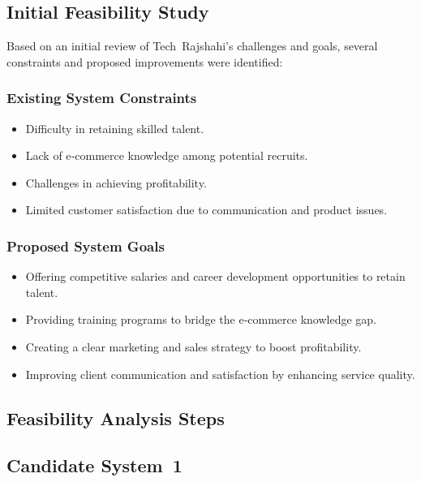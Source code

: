 \documentclass[12pt,a4paper]{article}
\begin{document}
\subsection{Initial Feasibility Study}
Based on an initial review of Tech Rajshahi’s challenges and goals, several constraints and proposed improvements were identified:
\subsubsection{Existing System Constraints}
\begin{itemize}
    \item Difficulty in retaining skilled talent.
    \item Lack of e‑commerce knowledge among potential recruits.
    \item Challenges in achieving profitability.
    \item Limited customer satisfaction due to communication and product issues.
\end{itemize}

\subsubsection{Proposed System Goals}
\begin{itemize}
    \item Offering competitive salaries and career development opportunities to retain talent.
    \item Providing training programs to bridge the e‑commerce knowledge gap.
    \item Creating a clear marketing and sales strategy to boost profitability.
    \item Improving client communication and satisfaction by enhancing service quality.
\end{itemize}

\subsection{Feasibility Analysis Steps}
\subsection*{Candidate System 1}
\end{document}
